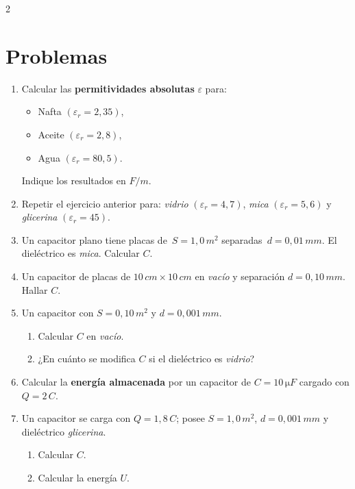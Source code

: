 \documentclass[a4paper,12pt]{article}
\begin{document}
\begin{multicols}{2}

\section*{Problemas}

\begin{enumerate}
\item Calcular las \textbf{permitividades absolutas} \(\varepsilon\) para:
\begin{itemize}\item Nafta \((\varepsilon_r=2{,}35)\),
\item Aceite \((\varepsilon_r=2{,}8)\),
\item Agua \((\varepsilon_r=80{,}5)\).
\end{itemize}
Indique los resultados en \(\si{F/m}\).

\item Repetir el ejercicio anterior para: \textit{vidrio} \((\varepsilon_r=4{,}7)\), \textit{mica} \((\varepsilon_r=5{,}6)\) y \textit{glicerina} \((\varepsilon_r=45)\).

\item Un capacitor plano tiene placas de \(\,S=1{,}0\,\si{m^2}\) separadas \(\,d=0{,}01\,\si{mm}\). El dieléctrico es \textit{mica}. Calcular \(C\).

\item Un capacitor de placas de \(10\,\si{cm}\times 10\,\si{cm}\) en \textit{vacío} y separación \(d=0{,}10\,\si{mm}\). Hallar \(C\).

\item Un capacitor con \(S=0{,}10\,\si{m^2}\) y \(d=0{,}001\,\si{mm}\). 
\begin{enumerate}
\item Calcular \(C\) en \textit{vacío}.
\item ¿En cuánto se modifica \(C\) si el dieléctrico es \textit{vidrio}?
\end{enumerate}

\item Calcular la \textbf{energía almacenada} por un capacitor de \(C=10\,\si{\micro F}\) cargado con \(Q=2\,\si{C}\).

\item Un capacitor se carga con \(Q=1{,}8\,\si{C}\); posee \(S=1{,}0\,\si{m^2}\), \(d=0{,}001\,\si{mm}\) y dieléctrico \textit{glicerina}. 
\begin{enumerate}
\item Calcular \(C\).
\item Calcular la energía \(U\).
\end{enumerate}


\end{enumerate}
\end{multicols}
\end{document}
